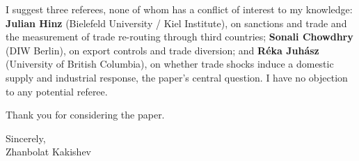 \documentclass[11pt]{article}
\begin{document}
I suggest three referees, none of whom has a conflict of interest to my knowledge:
\textbf{Julian Hinz} (Bielefeld University / Kiel Institute), on sanctions and trade and the
measurement of trade re-routing through third countries; \textbf{Sonali Chowdhry} (DIW
Berlin), on export controls and trade diversion; and \textbf{R\'eka Juh\'asz} (University of
British Columbia), on whether trade shocks induce a domestic supply and industrial response,
the paper's central question. I have no objection to any potential referee.

Thank you for considering the paper.

Sincerely,\\[0.6em]
Zhanbolat Kakishev
\end{document}

